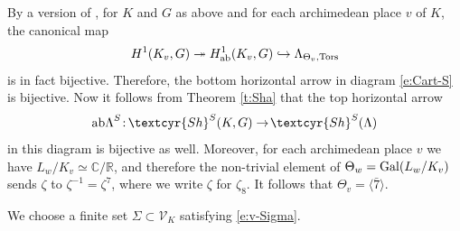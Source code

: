 \documentclass[11pt]{amsart}
\renewcommand{\mathbb}{\mathds}
\newcommand{\Sha}{{\!\textcyr{Sh}}}
\theoremstyle{plain}
\theoremstyle{definition}
\newcommand{\R}{{\mathbb R}}
\newcommand{\C}{{\mathbb C}}
\newcommand{\into}{\hookrightarrow}
\newcommand{\Gal}{{\rm Gal}}
\newcommand{\ab}{{\rm ab}}
\newcommand{\onto}{\twoheadrightarrow}
\newcommand{\V}{{\mathcal V}}
\newcommand{\Tors}{{\rm Tors}}
\newcommand{\Thvt}{{\Theta_v,\Tors}}
\newcommand{\la}{\langle}
\newcommand{\ra}{\rangle}
\newcommand{\abLambda}{{{\rm ab}\Lambda}}
\begin{document}
By a version of \cite[Lemma 7.5.2]{BK}, for $K$ and  $G$ as above
and for each  archimedean place $v$ of $K$, the canonical map
\[H^1(K_v,G)\onto H^1_\ab(K_v,G)\into \Lambda_\Thvt\]
is in fact bijective.
Therefore, the bottom horizontal arrow in diagram \eqref{e:Cart-S} is bijective.
Now it follows from Theorem \ref{t:Sha} that the top horizontal arrow
\begin{equation}\label{e:abLambda}
\abLambda^S\colon \Sha^S(K,G)\to \Sha^S(\Lambda)
\end{equation}
in this diagram is bijective as well.
Moreover, for each  archimedean place $v$ we have $L_w/K_v\simeq\C/\R$, and therefore
the non-trivial element of $\Theta_w=\Gal(L_w/K_v)$ sends $\zeta$ to $\zeta^{-1}=\zeta^7$,
where we write $\zeta$ for $\zeta_8$.
It follows that $\Theta_v=\la\bar 7 \ra$.

We choose a finite set $\Sigma\subset \V_K$ satisfying \eqref{e:v-Sigma}.
\end{document}
